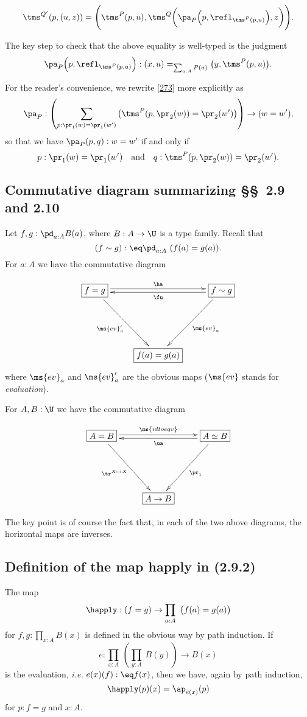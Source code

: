 \documentclass[12pt]{article}
\begin{document}
\begin{equation}\label{ld}
\tms^{Q'}(p,(u,z))=\Bigg(\tms^P(p,u),\tms^Q\bigg(\pa_P\Big(p,\refl_{\tms^P(p,u)}\Big),z\bigg)\Bigg).
\end{equation}

The key step to check that the above equality is well-typed is the judgment 
$$
\pa_P\Big(p,\refl_{\tms^P(p,u)}\Big):(x,u)=_{\sum_{a:A}P(a)}\big(y,\tms^P(p,u)\big).
$$ 

For the reader's convenience, we rewrite \eqref{273} more explicitly as 
$$
\pa_P:\left(\sum_{p:\pr_1(w)=\pr_1(w')}\big(\tms^P(p,\pr_2(w))=\pr_2(w')\big)\right)\to(w=w'),
$$ 
so that we have $\pa_P(p,q):w=w'$ if and only if 
$$
p:\pr_1(w)=\pr_1(w')\quad\text{and}\quad q:\tms^P(p,\pr_2(w))=\pr_2(w').
$$


\subsection{Commutative diagram summarizing \S\S\ 2.9 and 2.10}\label{209210}

Let $f,g:\pd_{a:A}B(a)$, where $B:A\to\U$ is a type family. Recall that 
$$
(f\sim g):\eq\pd_{a:A}\ (f(a)=g(a)).
$$ 
For $a:A$ we have the commutative diagram

$$
\xymatrix{
\boxed{f=g}\ar[ddr]_{\ms{ev}'_a}\ar@<2pt>[rr]^\ha&&\boxed{f\sim g}\ar[ddl]^{\ms{ev}_a}\ar@<2pt>[ll]^\fu\\ \\
&\boxed{f(a)=g(a)}}
$$ 
where $\ms{ev}_a$ and $\ms{ev}'_a$ are the obvious maps ($\ms{ev}$ stands for \emph{evaluation}).

For $A,B:\U$ we have the commutative diagram

$$
\xymatrix{
\boxed{A=B}\ar[ddr]_{\tr^{X\mapsto X}}\ar@<2pt>[rr]^{\ms{idtoeqv}}&&\boxed{A\simeq B}\ar[ddl]^{\pr_1}\ar@<2pt>[ll]^\ua\\ \\
&\boxed{A\to B}}
$$

The key point is of course the fact that, in each of the two above diagrams, the horizontal maps are inverses.


\subsection{Definition of the map \textsf{happly} in (2.9.2)}

The map 
$$
\happly:(f=g)\to\prod_{a:A}\ \big(f(a)=g(a)\big)
$$ 
for $f,g:\prod_{x:A}B(x)$ is defined in the obvious way by path induction. If 
$$
e:\prod_{x:A}\ \left(\prod_{y:A}\ B(y)\right)\to B(x)
$$ 
is the evaluation, \emph{i.e.} $e(x)(f):\eq f(x)$, then we have, again by path induction, 
$$
\happly(p)(x)=\ap_{e(x)}(p)
$$ 
for $p:f=g$ and $x:A$. 
\end{document}

